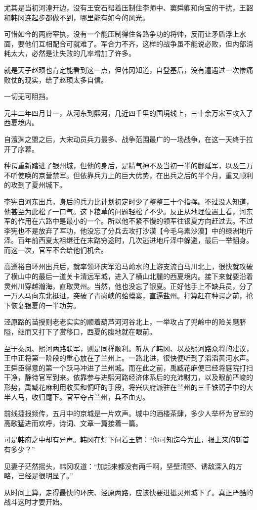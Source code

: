 尤其是当初河湟开边，没有王安石帮着压制住李师中、窦舜卿和向宝的干扰，王韶和韩冈连起步都做不到，哪里能有如今的风光。

可惜如今的两府宰执，没有一个能压制得住各路争功的将帅，反而让矛盾浮上水面，要他们互相配合可就难了。军合力不齐，这样的战争虽不能说必败，但内部消耗太大，必然是让失败的几率增加了许多。

就是天子赵顼也肯定能看到这一点，但韩冈知道，自登基后，没有遭遇过一次惨痛败仗的现实，给了赵顼太多自信。

一切无可阻挡。

元丰二年四月廿一，从河东到熙河，几近四千里的国境线上，三十余万宋军攻入了西夏境内。

自澶渊之盟之后，大宋动员兵力最多、战争范围最广的一场战争，在这一天终于拉开了序幕。

种谔重新踏进了银州城，但他的身后，是精气神不及当初一半的鄜延军，以及三万不听使唤的京营禁军。但依靠兵力上的巨大优势，在出兵之后的半个月，重又顺利的攻到了夏州城下。

李宪自河东出兵，身后的兵力比计划初定时少了整整三十个指挥。不过没人知道，他甚至为此松了一口气。这下粮草的问题轻松了不少。反正从地理位置上看，河东军的作用在六路中是最小的一个。所以他不紧不慢的领军往银夏方向赶过去。不过李宪也不是放弃了军功，他没忘了分兵去攻打沙漠【今毛乌素沙漠】中的绿洲地斤泽。百年前西夏太祖继迁在末路穷途时，几次逃进地斤泽中躲避，最后一举翻身。而这一次，官军不会给他们机会。

高遵裕自环州出兵后，就率领环庆军沿马岭水的上游支流白马川北上，很快就攻破了横山中的最后一道关卡清远军城，进入了横山北麓的西夏境内。接下来就要沿着灵州川穿越瀚海，直取灵州。当然，他也没忘了银夏。正好他手上不缺兵员，分了一万人马向东北挺进，突破了青岗峡的蛤蟆寨，直逼盐州。打算赶在种谔之前，抢下恢复银夏的一半功劳。

泾原路的苗授则老老实实的顺着葫芦河河谷北上，一举攻占了兜岭中的险关磨脐隘，继而又打下了赏移口，西夏的腹地就在眼前。

至于秦凤、熙河两路联军，则是同样顺利。听从了韩冈、以及熙河路众将的建议，王中正将第一阶段的重心放在了兰州上。一路北进，很快便听到了滔滔黄河水声。王舜臣得意的第一个跃马冲进了兰州城。而在此之前，禹臧花麻便已经将庭院打扫干净，静待官军到来。依靠参与进熙河路经济体系后的充沛财力，以及眼前严峻的形势，禹臧花麻利用收买和恫吓的手段，将兴庆府派驻在兰州的三千铁鹞子中的大半人马，收归麾下。官军夺占兰州，兵不血刃。

前线捷报频传，五月中的京城是一片欢声。城中的酒楼茶肆，多少人举杯为官军的高歌猛进而欢呼，诗词、文章一篇接着一篇。

可是韩府之中却有异声。韩冈在灯下问着王旖：“你可知迄今为止，报上来的斩首有多少？”

见妻子茫然摇头，韩冈叹道：“加起来都没有两千啊，坚壁清野、诱敌深入的方略，已经是很明显了。”

从时间上算，走得最快的环庆、泾原两路，应该快要进抵灵州城下了。真正严酷的战斗这时才要开始。

